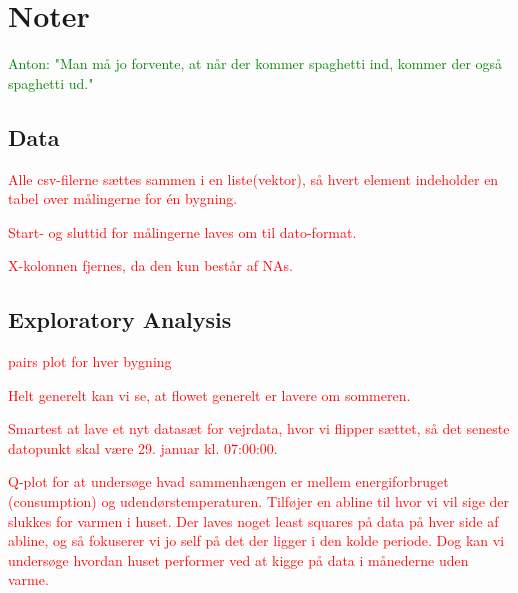 \chapter{Noter}

\textcolor{green}{Anton: "Man må jo forvente, at når der kommer spaghetti ind, kommer der også spaghetti ud."}

\section{Data}
\textcolor{red}{Alle csv-filerne sættes sammen i en liste(vektor), så hvert element indeholder en tabel over målingerne for én bygning.}

\textcolor{red}{Start- og sluttid for målingerne laves om til dato-format.}

\textcolor{red}{X-kolonnen fjernes, da den kun består af NAs.}


\section{Exploratory Analysis}

\textcolor{red}{pairs plot for hver bygning}

\textcolor{red}{Helt generelt kan vi se, at flowet generelt er lavere om sommeren.}

\textcolor{red}{Smartest at lave et nyt datasæt for vejrdata, hvor vi flipper sættet, så det seneste datopunkt skal være 29. januar kl. 07:00:00.}

\textcolor{red}{Q-plot for at undersøge hvad sammenhængen er mellem energiforbruget (consumption) og udendørstemperaturen. Tilføjer en abline til hvor vi vil sige der slukkes for varmen i huset. Der laves noget least squares på data på hver side af abline, og så fokuserer vi jo self på det der ligger i den kolde periode. Dog kan vi undersøge hvordan huset performer ved at kigge på data i månederne uden varme.}